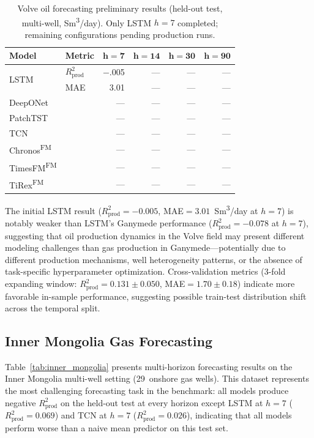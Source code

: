 \documentclass[conference]{IEEEtran}
\begin{document}
\begin{table}[t]
\centering
\caption{Volve oil forecasting preliminary results (held-out test, multi-well, Sm\textsuperscript{3}/day). Only LSTM $h{=}7$ completed; remaining configurations pending production runs.}
\label{tab:volve}
\small
\setlength{\tabcolsep}{2.5pt}
\begin{tabular}{@{}ll rrrr @{}}
\toprule
\textbf{Model} & \textbf{Metric} & $\boldsymbol{h{=}7}$ & $\boldsymbol{h{=}14}$ & $\boldsymbol{h{=}30}$ & $\boldsymbol{h{=}90}$ \\
\midrule
\multirow{2}{*}{LSTM}
 & $R^2_\text{prod}$ & $-$.005 & --- & --- & --- \\
 & MAE              & 3.01 & --- & --- & --- \\
\midrule
DeepONet & & --- & --- & --- & --- \\
PatchTST & & --- & --- & --- & --- \\
TCN      & & --- & --- & --- & --- \\
\midrule
Chronos\textsuperscript{FM}  & & --- & --- & --- & --- \\
TimesFM\textsuperscript{FM}  & & --- & --- & --- & --- \\
TiRex\textsuperscript{FM}    & & --- & --- & --- & --- \\
\bottomrule
\end{tabular}
\end{table}

The initial LSTM result ($R^2_\text{prod}{=}-0.005$, MAE${=}3.01$~Sm\textsuperscript{3}/day at $h{=}7$) is notably weaker than LSTM's Ganymede performance ($R^2_\text{prod}{=}-0.078$ at $h{=}7$), suggesting that oil production dynamics in the Volve field may present different modeling challenges than gas production in Ganymede---potentially due to different production mechanisms, well heterogeneity patterns, or the absence of task-specific hyperparameter optimization. Cross-validation metrics (3-fold expanding window: $R^2_\text{prod}{=}0.131 \pm 0.050$, MAE${=}1.70 \pm 0.18$) indicate more favorable in-sample performance, suggesting possible train-test distribution shift across the temporal split.

\subsection{Inner Mongolia Gas Forecasting}

Table~\ref{tab:inner_mongolia} presents multi-horizon forecasting results on the Inner Mongolia multi-well setting (29~onshore gas wells). This dataset represents the most challenging forecasting task in the benchmark: all models produce negative $R^2_\text{prod}$ on the held-out test at every horizon except LSTM at $h{=}7$ ($R^2_\text{prod}{=}0.069$) and TCN at $h{=}7$ ($R^2_\text{prod}{=}0.026$), indicating that all models perform worse than a naive mean predictor on this test set.
\end{document}
